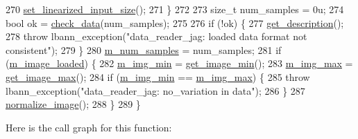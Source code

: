\begin{DoxyCode}
270     \hyperlink{classlbann_1_1data__reader__jag_a15f9aab2180ff66b7b5ace00957740df}{set\_linearized\_input\_size}();
271   \}
272   
273   \textcolor{keywordtype}{size\_t} num\_samples = 0u;
274   \textcolor{keywordtype}{bool} ok = \hyperlink{classlbann_1_1data__reader__jag_a2f6bcf33c1efdcef1c0cc0ac9756968b}{check\_data}(num\_samples);
275 
276   \textcolor{keywordflow}{if} (!ok) \{
277     \hyperlink{classlbann_1_1data__reader__jag_a627474a612a158675918ec5b5518c80f}{get\_description}();
278     \textcolor{keywordflow}{throw} lbann\_exception(\textcolor{stringliteral}{"data\_reader\_jag: loaded data format not consistent"});
279   \}
280   \hyperlink{classlbann_1_1data__reader__jag_a25ceffff7e8d6641e785efa033530011}{m\_num\_samples} = num\_samples;
281   \textcolor{keywordflow}{if} (\hyperlink{classlbann_1_1data__reader__jag_a3f1691818996f73dc918dfd0e8f98a70}{m\_image\_loaded}) \{
282     \hyperlink{classlbann_1_1data__reader__jag_a273907a834d9bd234b21f88ee72076be}{m\_img\_min} = \hyperlink{classlbann_1_1data__reader__jag_a7fd3f8e1b26f624bc91fac8fe4cff85e}{get\_image\_min}();
283     \hyperlink{classlbann_1_1data__reader__jag_ab71122303357978ff1de2e2c1d1ac0ed}{m\_img\_max} = \hyperlink{classlbann_1_1data__reader__jag_abf4e3248e1f319202d0bb370316f0d8a}{get\_image\_max}();
284     \textcolor{keywordflow}{if} (\hyperlink{classlbann_1_1data__reader__jag_a273907a834d9bd234b21f88ee72076be}{m\_img\_min} == \hyperlink{classlbann_1_1data__reader__jag_ab71122303357978ff1de2e2c1d1ac0ed}{m\_img\_max}) \{
285       \textcolor{keywordflow}{throw} lbann\_exception(\textcolor{stringliteral}{"data\_reader\_jag: no\_variation in data"});
286     \}
287     \hyperlink{classlbann_1_1data__reader__jag_ad145def7b548ca2d0d3f207f6376b114}{normalize\_image}();
288   \}
289 \}
\end{DoxyCode}
Here is the call graph for this function\+:\nopagebreak
